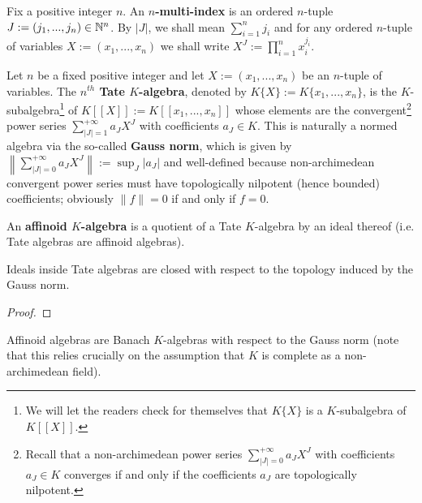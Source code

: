             \begin{convention} \label{conv: mutli_indices}
                Fix a positive integer $n$. An \textbf{$n$-multi-index} is an ordered $n$-tuple $J := (j_1, ..., j_n) \in \mathbb{N}^n$. By $|J|$, we shall mean $\sum_{i = 1}^n j_i$ and for any ordered $n$-tuple of variables $X := (x_1, ..., x_n)$ we shall write $X^J := \prod_{i = 1}^n x_i^{j_i}$.
            \end{convention}
            \begin{definition} \label{def: affinoid_algebras}
                Let $n$ be a fixed positive integer and let $X := (x_1, ..., x_n)$ be an $n$-tuple of variables. The \textbf{$n^{th}$ Tate $K$-algebra}, denoted by $K\{X\} := K\{x_1, ..., x_n\}$, is the $K$-subalgebra\footnote{We will let the readers check for themselves that $K\{X\}$ is a $K$-subalgebra of $K[\![X]\!]$.} of $K[\![X]\!] := K[\![x_1, ..., x_n]\!]$ whose elements are the convergent\footnote{Recall that a non-archimedean power series $\sum_{|J| = 0}^{+\infty} a_J X^J$ with coefficients $a_J \in K$ converges if and only if the coefficients $a_J$ are topologically nilpotent.} power series $\sum_{|J| = 1}^{+\infty} a_J X^J$ with coefficients $a_J \in K$. This is naturally a normed algebra via the so-called \textbf{Gauss norm}, which is given by $\left\|\sum_{|J| = 0}^{+\infty} a_J X^J\right\| := \sup_J |a_J|$ and well-defined because non-archimedean convergent power series must have topologically nilpotent (hence bounded) coefficients; obviously $\|f\| = 0$ if and only if $f = 0$.
                
                An \textbf{affinoid $K$-algebra} is a quotient of a Tate $K$-algebra by an ideal thereof (i.e. Tate algebras are  affinoid algebras). 
            \end{definition}
            \begin{lemma} \label{lemma: tate_algebra_ideals_are_closed}
                Ideals inside Tate algebras are closed with respect to the topology induced by the Gauss norm.
            \end{lemma}
                \begin{proof}
                    
                \end{proof}
            \begin{proposition} \label{prop: affinoid_algebras_are_banach_algebras}
                Affinoid algebras are Banach $K$-algebras with respect to the Gauss norm (note that this relies crucially on the assumption that $K$ is complete as a non-archimedean field).
            \end{proposition}
